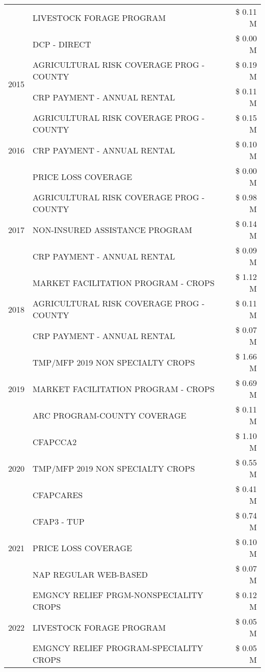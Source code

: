 \begin{tabular}{llr}
 & LIVESTOCK FORAGE PROGRAM & \$ 0.11 M \\
 & DCP - DIRECT & \$ 0.00 M \\
\cline{1-3}
\multirow[t]{2}{*}{2015} & AGRICULTURAL RISK COVERAGE PROG - COUNTY & \$ 0.19 M \\
 & CRP PAYMENT - ANNUAL RENTAL & \$ 0.11 M \\
\cline{1-3}
\multirow[t]{3}{*}{2016} & AGRICULTURAL RISK COVERAGE PROG - COUNTY & \$ 0.15 M \\
 & CRP PAYMENT - ANNUAL RENTAL & \$ 0.10 M \\
 & PRICE LOSS COVERAGE & \$ 0.00 M \\
\cline{1-3}
\multirow[t]{3}{*}{2017} & AGRICULTURAL RISK COVERAGE PROG - COUNTY & \$ 0.98 M \\
 & NON-INSURED ASSISTANCE PROGRAM & \$ 0.14 M \\
 & CRP PAYMENT - ANNUAL RENTAL & \$ 0.09 M \\
\cline{1-3}
\multirow[t]{3}{*}{2018} & MARKET FACILITATION PROGRAM - CROPS & \$ 1.12 M \\
 & AGRICULTURAL RISK COVERAGE PROG - COUNTY & \$ 0.11 M \\
 & CRP PAYMENT - ANNUAL RENTAL & \$ 0.07 M \\
\cline{1-3}
\multirow[t]{3}{*}{2019} & TMP/MFP 2019 NON SPECIALTY CROPS & \$ 1.66 M \\
 & MARKET FACILITATION PROGRAM - CROPS & \$ 0.69 M \\
 & ARC PROGRAM-COUNTY COVERAGE & \$ 0.11 M \\
\cline{1-3}
\multirow[t]{3}{*}{2020} & CFAPCCA2 & \$ 1.10 M \\
 & TMP/MFP 2019 NON SPECIALTY CROPS & \$ 0.55 M \\
 & CFAPCARES & \$ 0.41 M \\
\cline{1-3}
\multirow[t]{3}{*}{2021} & CFAP3 - TUP & \$ 0.74 M \\
 & PRICE LOSS COVERAGE & \$ 0.10 M \\
 & NAP REGULAR WEB-BASED & \$ 0.07 M \\
\cline{1-3}
\multirow[t]{3}{*}{2022} & EMGNCY RELIEF PRGM-NONSPECIALITY CROPS & \$ 0.12 M \\
 & LIVESTOCK FORAGE PROGRAM & \$ 0.05 M \\
 & EMGNCY RELIEF PROGRAM-SPECIALITY CROPS & \$ 0.05 M \\
\cline{1-3}
\bottomrule
\end{tabular}
